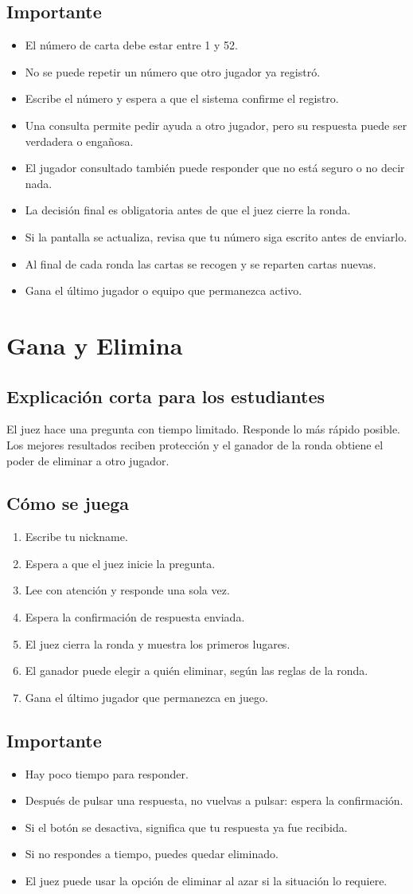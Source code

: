 \documentclass[12pt,a4paper]{article}
\newcommand{\juego}[1]{\section{#1}}
\newcommand{\subtitulo}[1]{\subsection*{#1}}
\begin{document}
\subtitulo{Importante}
\begin{itemize}
  \item El número de carta debe estar entre 1 y 52.
  \item No se puede repetir un número que otro jugador ya registró.
  \item Escribe el número y espera a que el sistema confirme el registro.
  \item Una consulta permite pedir ayuda a otro jugador, pero su respuesta puede ser verdadera o engañosa.
  \item El jugador consultado también puede responder que no está seguro o no decir nada.
  \item La decisión final es obligatoria antes de que el juez cierre la ronda.
  \item Si la pantalla se actualiza, revisa que tu número siga escrito antes de enviarlo.
  \item Al final de cada ronda las cartas se recogen y se reparten cartas nuevas.
  \item Gana el último jugador o equipo que permanezca activo.
\end{itemize}

\juego{Gana y Elimina}

\subtitulo{Explicación corta para los estudiantes}
\begin{tcolorbox}[colback=gris,colframe=rosado]
El juez hace una pregunta con tiempo limitado. Responde lo más rápido posible. Los mejores resultados reciben protección y el ganador de la ronda obtiene el poder de eliminar a otro jugador.
\end{tcolorbox}

\subtitulo{Cómo se juega}
\begin{enumerate}
  \item Escribe tu nickname.
  \item Espera a que el juez inicie la pregunta.
  \item Lee con atención y responde una sola vez.
  \item Espera la confirmación de respuesta enviada.
  \item El juez cierra la ronda y muestra los primeros lugares.
  \item El ganador puede elegir a quién eliminar, según las reglas de la ronda.
  \item Gana el último jugador que permanezca en juego.
\end{enumerate}

\subtitulo{Importante}
\begin{itemize}
  \item Hay poco tiempo para responder.
  \item Después de pulsar una respuesta, no vuelvas a pulsar: espera la confirmación.
  \item Si el botón se desactiva, significa que tu respuesta ya fue recibida.
  \item Si no respondes a tiempo, puedes quedar eliminado.
  \item El juez puede usar la opción de eliminar al azar si la situación lo requiere.
\end{itemize}
\end{document}
